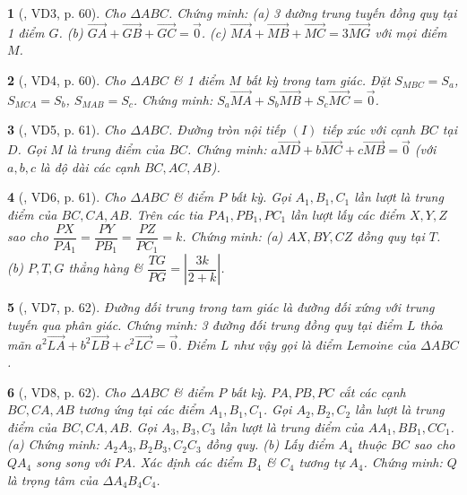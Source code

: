 \documentclass{article}
\newtheorem{baitoan}{}
\begin{document}
\begin{baitoan}[\cite{Hai_Hung_Thu_Tung2022_tap_1}, VD3, p. 60]
	Cho $\Delta ABC$. Chứng minh: (a) 3 đường trung tuyến đồng quy tại 1 điểm $G$. (b) $\overrightarrow{GA} + \overrightarrow{GB} + \overrightarrow{GC} = \vec{0}$. (c) $\overrightarrow{MA} + \overrightarrow{MB} + \overrightarrow{MC} = 3\overrightarrow{MG}$ với mọi điểm $M$.
\end{baitoan}

\begin{baitoan}[\cite{Hai_Hung_Thu_Tung2022_tap_1}, VD4, p. 60]
	Cho $\Delta ABC$ \& 1 điểm $M$ bất kỳ trong tam giác. Đặt $S_{MBC} = S_a$, $S_{MCA} = S_b$, $S_{MAB} = S_c$. Chứng minh: $S_a\overrightarrow{MA} + S_b\overrightarrow{MB} + S_c\overrightarrow{MC} = \vec{0}$.
\end{baitoan}

\begin{baitoan}[\cite{Hai_Hung_Thu_Tung2022_tap_1}, VD5, p. 61]
	Cho $\Delta ABC$. Đường tròn nội tiếp $(I)$ tiếp xúc với cạnh $BC$ tại $D$. Gọi $M$ là trung điểm của $BC$. Chứng minh: $a\overrightarrow{MD} + b\overrightarrow{MC} + c\overrightarrow{MB} = \vec{0}$ (với $a,b,c$ là độ dài các cạnh $BC,AC,AB$).
\end{baitoan}

\begin{baitoan}[\cite{Hai_Hung_Thu_Tung2022_tap_1}, VD6, p. 61]
	Cho $\Delta ABC$ \& điểm $P$ bất kỳ. Gọi $A_1,B_1,C_1$ lần lượt là trung điểm của $BC,CA,AB$. Trên các tia $PA_1,PB_1,PC_1$ lần lượt lấy các điểm $X,Y,Z$ sao cho $\dfrac{PX}{PA_1} = \dfrac{PY}{PB_1} = \dfrac{PZ}{PC_1} = k$. Chứng minh: (a) $AX,BY,CZ$ đồng quy tại $T$. (b) $P,T,G$ thẳng hàng \& $\dfrac{TG}{PG} = \left|\dfrac{3k}{2 + k}\right|$.
\end{baitoan}

\begin{baitoan}[\cite{Hai_Hung_Thu_Tung2022_tap_1}, VD7, p. 62]
	Đường đối trung trong tam giác là đường đối xứng với trung tuyến qua phân giác. Chứng minh: 3 đường đối trung đồng quy tại điểm $L$ thỏa mãn $a^2\overrightarrow{LA} + b^2\overrightarrow{LB} + c^2\overrightarrow{LC} = \vec{0}$. Điểm $L$ như vậy gọi là \emph{điểm Lemoine} của $\Delta ABC$.
\end{baitoan}

\begin{baitoan}[\cite{Hai_Hung_Thu_Tung2022_tap_1}, VD8, p. 62]
	Cho $\Delta ABC$ \& điểm $P$ bất kỳ. $PA,PB,PC$ cắt các cạnh $BC,CA,AB$ tương ứng tại các điểm $A_1,B_1,C_1$. Gọi $A_2,B_2,C_2$ lần lượt là trung điểm của $BC,CA,AB$. Gọi $A_3,B_3,C_3$ lần lượt là trung điểm của $AA_1,BB_1,CC_1$. (a) Chứng minh: $A_2A_3,B_2B_3,C_2C_3$ đồng quy. (b) Lấy điểm $A_4$ thuộc $BC$ sao cho $QA_4$ song song với $PA$. Xác định các điểm $B_4$ \& $C_4$ tương tự $A_4$. Chứng minh: $Q$ là trọng tâm của $\Delta A_4B_4C_4$.
\end{baitoan}
\end{document}
